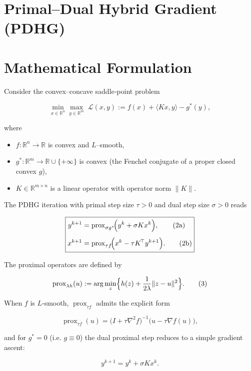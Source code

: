 \documentclass{article}
\begin{document}
\section*{Primal–Dual Hybrid Gradient (PDHG)}

\section*{Mathematical Formulation}
Consider the convex–concave saddle‑point problem  

\[
\min_{x\in\mathbb R^{n}} \max_{y\in\mathbb R^{m}} \; \mathcal L(x,y)
:= f(x)+\langle Kx ,y\rangle - g^{*}(y),
\tag{1}
\]

where  

\begin{itemize}[nosep]
\item $f:\mathbb R^{n}\!\to\!\mathbb R$ is convex and $L$–smooth,
\item $g^{*}:\mathbb R^{m}\!\to\!\mathbb R\cup\{+\infty\}$ is convex (the Fenchel conjugate of a proper closed convex $g$),
\item $K\in\mathbb R^{m\times n}$ is a linear operator with operator norm $\|K\|$.
\end{itemize}

The PDHG iteration with primal step size $\tau>0$ and dual step size $\sigma>0$ reads  

\[
\boxed{
\begin{aligned}
y^{k+1} &= \operatorname{prox}_{\sigma g^{*}}\!\Bigl(y^{k}+ \sigma K x^{k}\Bigr), \tag{2a}\\[4pt]
x^{k+1} &= \operatorname{prox}_{\tau f}\!\Bigl(x^{k}-\tau K^{\!\top} y^{k+1}\Bigr). \tag{2b}
\end{aligned}}
\]

The proximal operators are defined by  

\[
\operatorname{prox}_{\lambda h}(u):=
\arg\min_{z}\Bigl\{h(z)+\frac{1}{2\lambda}\|z-u\|^{2}\Bigr\}.
\tag{3}
\]

When $f$ is $L$‑smooth, $\operatorname{prox}_{\tau f}$ admits the explicit form  

\[
\operatorname{prox}_{\tau f}(u)=
\bigl(I+\tau \nabla^{2}f\bigr)^{-1}\!\bigl(u-\tau \nabla f(u)\bigr),
\tag{4}
\]

and for $g^{*}=0$ (i.e. $g\equiv 0$) the dual proximal step reduces to a simple gradient ascent:  

\[
y^{k+1}=y^{k}+ \sigma K x^{k}. \tag{5}
\]
\end{document}
